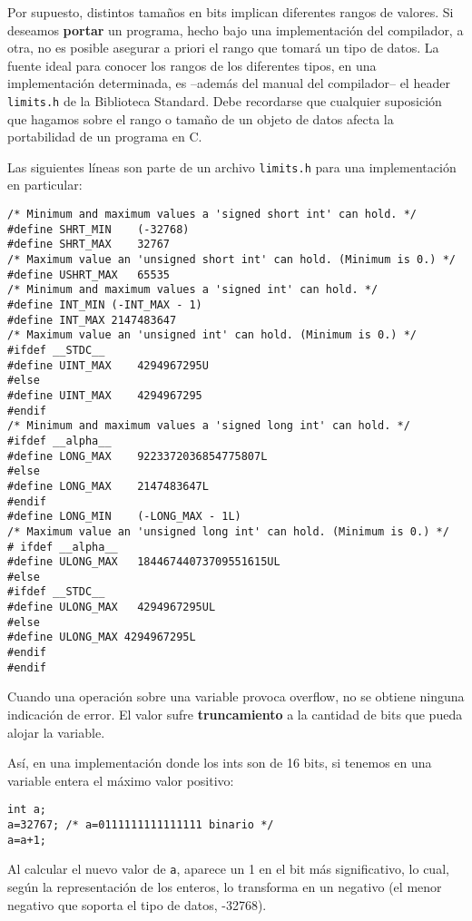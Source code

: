 Por supuesto, distintos tamaños en bits implican diferentes rangos de valores. Si deseamos \textbf{portar} un
programa, hecho bajo una implementación del compilador, a otra, no es posible asegurar a priori el
rango que tomará un tipo de datos. La fuente ideal para conocer los rangos de los diferentes tipos, en
una implementación determinada, es --además del manual del compilador-- el header \lstinline{limits.h} de la
Biblioteca Standard. Debe recordarse que cualquier suposición que hagamos sobre el rango o tamaño
de un objeto de datos afecta la portabilidad de un programa en C.

Las siguientes líneas son parte de un archivo \lstinline{limits.h} para una implementación en particular:

\begin{lstlisting}
/* Minimum and maximum values a 'signed short int' can hold. */
#define SHRT_MIN	(-32768)
#define SHRT_MAX	32767
/* Maximum value an 'unsigned short int' can hold. (Minimum is 0.) */
#define USHRT_MAX	65535
/* Minimum and maximum values a 'signed int' can hold. */
#define INT_MIN	(-INT_MAX - 1)
#define INT_MAX	2147483647
/* Maximum value an 'unsigned int' can hold. (Minimum is 0.) */
#ifdef __STDC__
#define UINT_MAX 	4294967295U
#else
#define UINT_MAX  	4294967295
#endif
/* Minimum and maximum values a 'signed long int' can hold. */
#ifdef __alpha__
#define LONG_MAX 	9223372036854775807L
#else
#define LONG_MAX	2147483647L
#endif
#define LONG_MIN 	(-LONG_MAX - 1L)
/* Maximum value an 'unsigned long int' can hold. (Minimum is 0.) */
# ifdef __alpha__
#define ULONG_MAX	18446744073709551615UL
#else
#ifdef __STDC__
#define ULONG_MAX 	4294967295UL
#else
#define ULONG_MAX 4294967295L
#endif
#endif
\end{lstlisting}

Cuando una operación sobre una variable provoca overflow, no se obtiene ninguna indicación de error.
El valor sufre \textbf{truncamiento} a la cantidad de bits que pueda alojar la variable.

Así, en una implementación donde los ints son de 16 bits, si tenemos en una variable entera el máximo
valor positivo:

\begin{lstlisting}
int a; 
a=32767; /* a=0111111111111111 binario */
a=a+1;
\end{lstlisting}

Al calcular el nuevo valor de \lstinline{a}, aparece un 1 en el bit más significativo, lo cual, según la representación de los enteros, lo transforma en un negativo (el menor negativo que soporta el tipo de datos, -32768).

